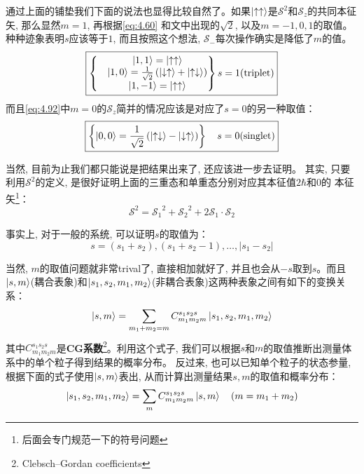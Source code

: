 \documentclass[a4paper,zihao=-4,linespread=1]{ctexrep}
\begin{document}
    通过上面的铺垫我们下面的说法也显得比较自然了。如果$\ket{\uparrow\uparrow}$是$\mathcal{S}^2$和$\mathcal{S}_z$的共同本征矢, 那么显然$m=1$, 再根据\ref{eq:4.60}
    和文中出现的$\sqrt{2}$, 以及$m=-1,0,1$的取值。种种迹象表明$s$应该等于$1$, 而且按照这个想法, $\mathcal{S}_-$每次操作确实是降低了$m$的值。
    \begin{equation}
        \boxed{
            \left\{
                \begin{matrix}
                   &\ket{1,1}=\ket{\uparrow\uparrow}\\
                    &\ket{1,0}=\frac{1}{\sqrt{2}}\left(\ket{\downarrow\uparrow}+\ket{\uparrow\downarrow}\right)\\
                    &\ket{1,-1}=\ket{\uparrow\uparrow} 
                \end{matrix}
            \right\}s=1\text{(triplet)}
        }
    \end{equation}
    而且\ref{eq:4.92}中$m=0$的$\mathcal{S}_z$简并的情况应该是对应了$s=0$的另一种取值：
    \begin{equation}
        \boxed{
            \left\{\ket{0,0}=\frac{1}{\sqrt{2}}\left(\ket{\uparrow\downarrow}-\ket{\downarrow\uparrow}\right)\right\}\quad s=0\text{(singlet)}
        }
    \end{equation}

    当然, 目前为止我们都只能说是把结果出来了, 还应该进一步去证明。 其实, 只要利用$\mathcal{S}^2$的定义, 是很好证明上面的三重态和单重态分别对应其本征值$2\hbar$和$0$的
    本征矢\footnote{后面会专门规范一下的符号问题}：
    \[\mathcal{S}^2={\mathcal{S}_1}^2+{\mathcal{S}_2}^2+2\mathcal{S}_1\cdot\mathcal{S}_2\]
    

    事实上, 对于一般的系统, 可以证明$s$的取值为：
    \begin{equation}
        \boxed{s=(s_1+s_2),(s_1+s_2-1),\ldots,|s_1-s_2|}
    \end{equation}
    
    当然, $m$的取值问题就非常trival了, 直接相加就好了, 并且也会从$-s$取到$s$。而且$\ket{s,m}$(耦合表象)和$\ket{s_1,s_2,m_1,m_2}$(非耦合表象)这两种表象之间有如下的变换关系：
    \begin{equation}
        \ket{s,m}=\sum_{m_1+m_2=m}C_{m_1m_2m}^{s_1s_2s}\ket{s_1,s_2,m_1,m_2}
    \end{equation}
    其中$C_{m_1m_2m}^{s_1s_2s}$是\textbf{CG系数}\footnote{Clebsch–Gordan coefficients}。利用这个式子, 我们可以根据$s$和$m$的取值推断出测量体系中的单个粒子得到结果的概率分布。
    反过来, 也可以已知单个粒子的状态参量, 根据下面的式子使用$\ket{s,m}$表出, 从而计算出测量结果$s,m$的取值和概率分布：
    \begin{equation}
        \ket{s_1,s_2,m_1,m_2}=\sum_{m}C_{m_1m_2m}^{s_1s_2s}\ket{s,m}\quad (m=m_1+m_2)
    \end{equation}
    
\end{document}
